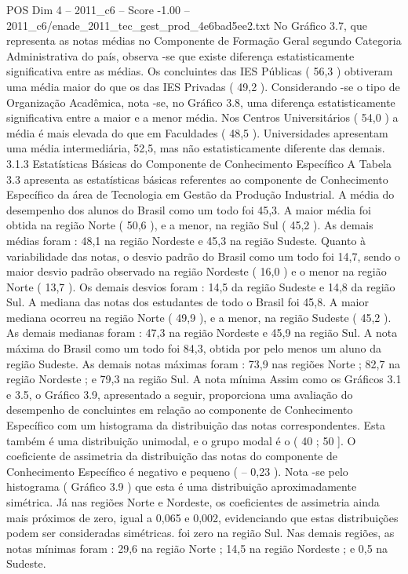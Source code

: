 \begin{textsample}{POS Dim 4 – 2011\_c6 – Score -1.00 – 2011\_c6/enade\_2011\_tec\_gest\_prod\_4e6bad5ee2.txt}
No Gráfico 3.7, que representa as notas médias no Componente de Formação Geral segundo Categoria Administrativa do país, observa -se que existe diferença estatisticamente significativa entre as médias.
Os concluintes das IES Públicas ( 56,3 ) obtiveram uma média maior do que os das IES Privadas ( 49,2 ).
Considerando -se o tipo de Organização Acadêmica, nota -se, no Gráfico 3.8, uma diferença estatisticamente significativa entre a maior e a menor média.
Nos Centros Universitários ( 54,0 ) a média é mais elevada do que em Faculdades ( 48,5 ).
Universidades apresentam uma média intermediária, 52,5, mas não estatisticamente diferente das demais. 3.1.3 Estatísticas Básicas do Componente de Conhecimento Específico A Tabela 3.3 apresenta as estatísticas básicas referentes ao componente de Conhecimento Específico da área de Tecnologia em Gestão da Produção Industrial.
A média do desempenho dos alunos do Brasil como um todo foi 45,3.
A maior média foi obtida na região Norte ( 50,6 ), e a menor, na região Sul ( 45,2 ).
As demais médias foram : 48,1 na região Nordeste e 45,3 na região Sudeste.
Quanto à variabilidade das notas, o desvio padrão do Brasil como um todo foi 14,7, sendo o maior desvio padrão observado na região Nordeste ( 16,0 ) e o menor na região Norte ( 13,7 ).
Os demais desvios foram : 14,5 da região Sudeste e 14,8 da região Sul.
A mediana das notas dos estudantes de todo o Brasil foi 45,8.
A maior mediana ocorreu na região Norte ( 49,9 ), e a menor, na região Sudeste ( 45,2 ).
As demais medianas foram : 47,3 na região Nordeste e 45,9 na região Sul.
A nota máxima do Brasil como um todo foi 84,3, obtida por pelo menos um aluno da região Sudeste.
As demais notas máximas foram : 73,9 nas regiões Norte ; 82,7 na região Nordeste ; e 79,3 na região Sul.
A nota mínima Assim como os Gráficos 3.1 e 3.5, o Gráfico 3.9, apresentado a seguir, proporciona uma avaliação do desempenho de concluintes em relação ao componente de Conhecimento Específico com um histograma da distribuição das notas correspondentes.
Esta também é uma distribuição unimodal, e o grupo modal é o ( 40 ; 50 ].
O coeficiente de assimetria da distribuição das notas do componente de Conhecimento Específico é negativo e pequeno ( – 0,23 ).
Nota -se pelo histograma ( Gráfico 3.9 ) que esta é uma distribuição aproximadamente simétrica.
Já nas regiões Norte e Nordeste, os coeficientes de assimetria ainda mais próximos de zero, igual a 0,065 e 0,002, evidenciando que estas distribuições podem ser consideradas simétricas. foi zero na região Sul.
Nas demais regiões, as notas mínimas foram : 29,6 na região Norte ; 14,5 na região Nordeste ; e 0,5 na Sudeste.

\end{textsample}
